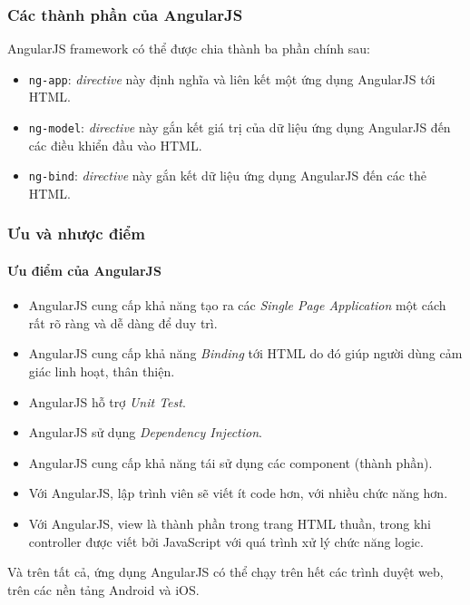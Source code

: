\documentclass[a4paper]{article}
\begin{document}
\subsubsection{Các thành phần của AngularJS}
AngularJS framework có thể được chia thành ba phần chính sau:
\begin{itemize}
	\item \lstinline{ng-app}: \textit{directive} này định nghĩa và liên kết một ứng dụng AngularJS tới HTML.

	\item \lstinline{ng-model}: \textit{directive} này gắn kết giá trị của dữ liệu ứng dụng AngularJS đến các điều khiển đầu vào HTML.

	\item \lstinline{ng-bind}: \textit{directive} này gắn kết dữ liệu ứng dụng AngularJS đến các thẻ HTML.
\end{itemize}
\subsubsection{Ưu và nhược điểm}
\paragraph*{Ưu điểm của AngularJS}
\begin{itemize}
	\item AngularJS cung cấp khả năng tạo ra các \textit{Single Page Application} một cách rất rõ ràng và dễ dàng để duy trì.

	\item AngularJS cung cấp khả năng \textit{Binding} tới HTML do đó giúp người dùng cảm giác linh hoạt, thân thiện.

	\item AngularJS hỗ trợ \textit{Unit Test}.

	\item AngularJS sử dụng \textit{Dependency Injection}.

	\item AngularJS cung cấp khả năng tái sử dụng các component (thành phần).

	\item Với AngularJS, lập trình viên sẽ viết ít code hơn, với nhiều chức năng hơn.

	\item Với AngularJS, view là thành phần trong trang HTML thuần, trong khi controller được viết bởi JavaScript với quá trình xử lý chức năng logic.
\end{itemize}
Và trên tất cả, ứng dụng AngularJS có thể chạy trên hết các trình duyệt web, trên các nền tảng Android và iOS.
\end{document}

